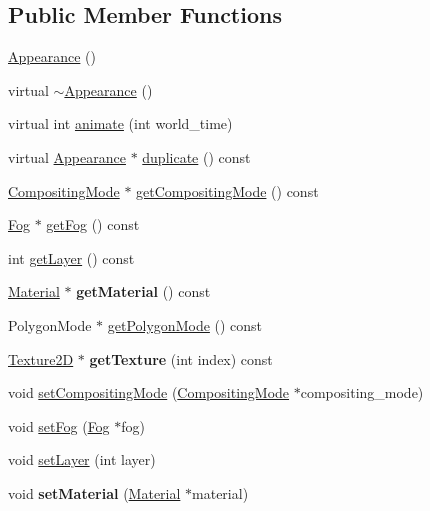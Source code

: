 \subsection*{Public Member Functions}
\begin{CompactItemize}
\item 
\hyperlink{classm3g_1_1Appearance_2e594c7b96cb5cfad839a98b57f5d42f}{Appearance} ()
\item 
virtual \hyperlink{classm3g_1_1Appearance_c05c93d7a0f286cb9471b6c667ffeee1}{$\sim$Appearance} ()
\item 
virtual int \hyperlink{classm3g_1_1Appearance_8aad1ceab4c2a03609c8a42324ce484d}{animate} (int world\_\-time)
\item 
virtual \hyperlink{classm3g_1_1Appearance}{Appearance} $\ast$ \hyperlink{classm3g_1_1Appearance_ceaab703eb45cba7cf8705bc3a087127}{duplicate} () const 
\item 
\hyperlink{classm3g_1_1CompositingMode}{CompositingMode} $\ast$ \hyperlink{classm3g_1_1Appearance_e4045934febb56891c15e14486b239a8}{getCompositingMode} () const 
\item 
\hyperlink{classm3g_1_1Fog}{Fog} $\ast$ \hyperlink{classm3g_1_1Appearance_93143a921b998ff69576147a59eb44d4}{getFog} () const 
\item 
int \hyperlink{classm3g_1_1Appearance_df831e0e0ebf9d7e997150e497e6a6cf}{getLayer} () const 
\item 
\hypertarget{classm3g_1_1Appearance_a412c7074ed5d51f6b8b6fd89275c405}{
\hyperlink{classm3g_1_1Material}{Material} $\ast$ \textbf{getMaterial} () const }
\label{classm3g_1_1Appearance_a412c7074ed5d51f6b8b6fd89275c405}

\item 
PolygonMode $\ast$ \hyperlink{classm3g_1_1Appearance_dd3ddcefcd18339150d281b155602886}{getPolygonMode} () const 
\item 
\hypertarget{classm3g_1_1Appearance_987cc21bd78d0e4e664da717479bdd57}{
\hyperlink{classm3g_1_1Texture2D}{Texture2D} $\ast$ \textbf{getTexture} (int index) const }
\label{classm3g_1_1Appearance_987cc21bd78d0e4e664da717479bdd57}

\item 
void \hyperlink{classm3g_1_1Appearance_8f9514f1c01268fff95b7c31f3a194b6}{setCompositingMode} (\hyperlink{classm3g_1_1CompositingMode}{CompositingMode} $\ast$compositing\_\-mode)
\item 
void \hyperlink{classm3g_1_1Appearance_bc1a612006d6b4c3d443ff6ab542c788}{setFog} (\hyperlink{classm3g_1_1Fog}{Fog} $\ast$fog)
\item 
void \hyperlink{classm3g_1_1Appearance_fbd2fbd594c8ee140b028f505631f682}{setLayer} (int layer)
\item 
\hypertarget{classm3g_1_1Appearance_1dfd1a55fa3cc625719dab8e95c8a2de}{
void \textbf{setMaterial} (\hyperlink{classm3g_1_1Material}{Material} $\ast$material)}
\label{classm3g_1_1Appearance_1dfd1a55fa3cc625719dab8e95c8a2de}


\end{CompactItemize}
